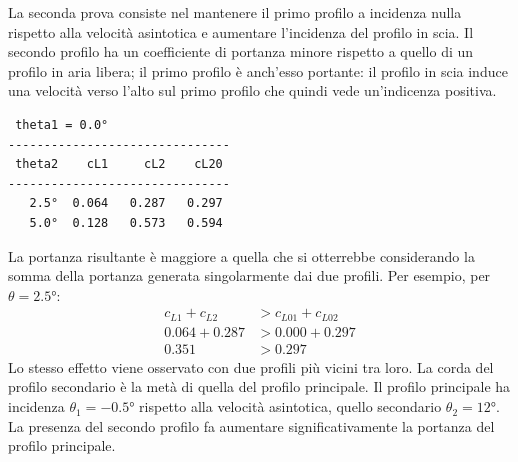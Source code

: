  La seconda prova consiste nel mantenere il primo profilo a incidenza nulla
 rispetto alla velocità asintotica e aumentare l'incidenza del profilo in scia.
 Il secondo profilo ha un coefficiente di portanza minore rispetto a quello
 di un profilo in aria libera; il primo profilo è anch'esso portante: il
 profilo in scia induce una velocità verso l'alto sul primo profilo che quindi
 vede un'indicenza positiva.
\begin{center}
\begin{verbatim}
 theta1 = 0.0°
-------------------------------
 theta2    cL1     cL2    cL20 
-------------------------------
   2.5°  0.064   0.287   0.297 
   5.0°  0.128   0.573   0.594 
\end{verbatim}
\end{center}
 La portanza risultante è maggiore a quella che si otterrebbe considerando
 la somma della portanza generata singolarmente dai due profili. Per esempio,
 per $\theta = 2.5°$:
\begin{equation}
\begin{aligned}
 c_{L1} + c_{L2} & > c_{L01} + c_{L02} \\
  0.064 + 0.287  & >  0.000  +  0.297  \\
          0.351  & >  0.297
\end{aligned}
\end{equation}
Lo stesso effetto viene osservato con due profili più vicini tra loro. La corda
 del profilo secondario è la metà di quella del profilo principale.
 Il profilo principale ha incidenza $\theta_1 = -0.5°$ rispetto alla velocità
 asintotica, quello secondario $\theta_2 = 12°$. La presenza del secondo 
 profilo fa aumentare significativamente la portanza del profilo principale.

